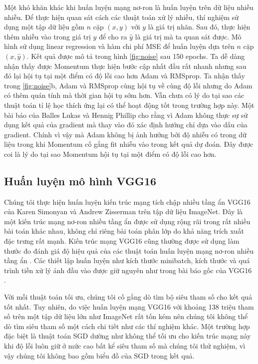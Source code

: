 Một khó khăn khác khi huấn luyện mạng nơ-ron là huấn luyện trên dữ liệu nhiều nhiễu. Để thực hiện quan sát cách các thuật toán xử lý nhiễu, thí nghiệm sử dụng một tập dữ liệu gồm $n$ cặp $(x,y)$ với $y$ là giá trị nhãn. Sau đó, thực hiện thêm nhiễu vào trong giá trị $y$ để cho ra $\hat y$ là giá trị mà ta quan sát được. Mô hình sử dụng linear regression và hàm chi phí MSE để huấn luyện dựa trên $n$ cặp $(x,\hat y)$. Kết quả được mô tả trong hình \ref{fig:noise} sau 150 epochs. Ta dễ dàng nhận thấy được Momentum thực hiện bước cập nhất đầu rất nhanh nhưng sau đó lại hội tụ tại một điểm có độ lỗi cao hơn Adam và RMSprop. Ta nhận thấy trong \ref{fig:noise}b, Adam và RMSprop cùng hội tụ về cùng độ lỗi nhưng do Adam có thêm quán tính mà thời gian hội tụ sớm hơn. Vẫn chưa có lý do tại sao các thuật toán tỉ lệ học thích ứng lại có thể hoạt động tốt trong trường hợp này. Một bài báo của Balles Lukas và Hennig Phillip \cite{balles2018dissecting} cho rằng vì Adam không thực sự sử dụng kết quả của gradient mà thay vào đó xác định hướng chỉ dựa vào dấu của gradient. Chính vì vậy mà Adam không bị ảnh hưởng bởi độ nhiễu có trong dữ liệu trong khi Momentum cố gắng fit nhiễu vào trong kết quả dự đoán. Đây được coi là lý do tại sao Momentum hội tụ tại một điểm có độ lỗi cao hơn.

\subsection{Huấn luyện mô hình VGG16}

Chúng tôi thực hiện huấn luyện kiến trúc mạng tích chập nhiều tầng ẩn VGG16 của Karen Simonyan và Andrew Zisserman \cite{simonyan2014verydeep} trên tập dữ liệu ImageNet. Đây là một kiến trúc mạng nơ-ron nhiều tầng ẩn được sử dụng rộng rãi trong rất nhiều bài toán khác nhau, không chỉ riêng bài toán phân lớp do khả năng trích xuất đặc trưng rất mạnh. Kiến trúc mạng VGG16 cũng thường được sử dụng làm thước đo đánh giá độ hiệu quả của các thuật toán huấn luyện mạng nơ-ron nhiều tầng ẩn \cite{zhuang2020adabelief}\cite{schneider2018deepobs}. Các thiết lập huấn luyện như kích thước minibatch, kích thước và quá trình tiền xử lý ảnh đầu vào được giữ nguyên như trong bài báo gốc của VGG16 \cite{simonyan2014verydeep}.

Với mỗi thuật toán tối ưu, chúng tôi cố gắng dò tìm bộ siêu tham số cho kết quả tốt nhất. Tuy nhiên, do việc huấn luyện mạng VGG16 với khoảng 138 triệu tham số trên một tập dữ liệu lớn như ImageNet rất tốn kém nên chúng tôi không thể dò tìm siêu tham số một cách chi tiết như các thí nghiệm khác. Một trường hợp đặc biệt là thuật toán SGD dường như không thể tối ưu cho kiến trúc mạng này khi độ lỗi luôn giữ ở mức cao bất kể siêu tham số mà chúng tôi thử nghiệm, vì vậy chúng tôi không bao gồm biểu đồ của SGD trong kết quả.

